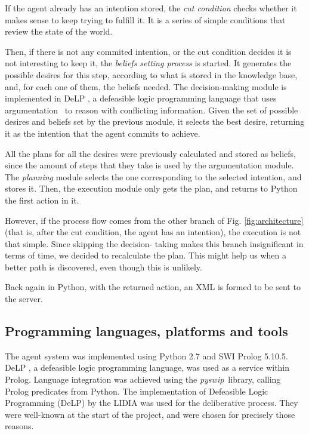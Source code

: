 \documentclass{llncs2e/llncs}
\begin{document}
    If the agent already has an intention stored, the \textit{cut condition}
    checks whether it makes sense to keep trying to fulfill it. It is a series
    of simple conditions that review the state of the world.

    Then, if there is not any commited intention, or the cut condition decides 
    it is not interesting to keep it, the \textit{beliefs setting process} is 
    started. It generates the possible desires for this step, according to what 
    is stored in the knowledge base, and, for each one of them, the beliefs 
    needed. 
    The decision-making module is implemented in DeLP\cite{Rotstein:2007}
    \cite{Ferretti:2008},
    a defeasible logic 
    programming language that uses argumentation 
    \cite{DBLP:conf/comma/2008}\ to reason with conflicting
    information. 
    Given the set of possible 
    desires and beliefs set by the previous module, it selects the best desire, 
    returning it as the intention that the agent commits to achieve.

    All the plans for all the desires were previously calculated and stored as 
    beliefs, since the amount of steps that they take is used by the 
    argumentation module. The \textit{planning} module selects the one 
    corresponding to the selected intention, and stores it. Then, the 
    execution module only gets the plan, and returns to Python the first 
    action in it.

    However, if the process flow comes from the other branch of Fig. 
    \ref{fig:architecture} (that is, after the cut condition, the agent has an 
    intention), the execution is not that simple. Since skipping the decision-
    taking makes this branch insignificant in terms of time, we decided to 
    recalculate the plan. This might help us when a better path is discovered, 
    even though this is unlikely.

    Back again in Python, with the returned action, an XML is formed to be sent 
    to the server.

\subsection{Programming languages, platforms and tools}

    The agent system was implemented using Python 2.7 and SWI Prolog 5.10.5. DeLP 
    \cite{Garcia:2004a}, a defeasible logic programming language, was used as a 
    service within Prolog. 
    Language integration was achieved using the \textit{pyswip}\ library, 
    calling Prolog predicates from Python. The implementation of Defeasible 
    Logic Programming (DeLP) by the LIDIA was used for the deliberative 
    process. They were well-known at the start of the project, and were chosen 
    for precisely those reasons.
    
\end{document}
